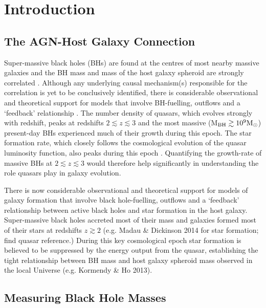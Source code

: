 \chapter{Introduction}\label{ch:introduction}

\section{The AGN-Host Galaxy Connection}

Super-massive black holes (BHs) are found at the centres of most nearby massive galaxies and the BH mass and mass of the host galaxy spheroid are strongly correlated \citep{ferrarese00,gebhardt00,kormendy13}. 
Although any underlying causal mechanism(s) responsible for the correlation is yet to be conclusively identified, there is considerable observational and theoretical support for models that involve BH-fuelling, outflows and a `feedback' relationship \citep[e.g.][]{king15}.  
The number density of quasars, which evolves strongly with redshift, peaks at redshifts $2 \lesssim z \lesssim 3$ \citep[e.g.][]{brandt05,richards06b} and the most massive (M$_{\rm BH} \gtrsim 10^9{{{\rm M_\odot}}}$) present-day BHs experienced much of their growth during this epoch.  
The star formation rate, which closely follows the cosmological evolution of the quasar luminosity function, also peaks during this epoch \citep[e.g.][]{boyle98}. 
Quantifying the growth-rate of massive BHs at $2 \lesssim z \lesssim 3$ would therefore help significantly in understanding the role quasars play in galaxy evolution.

There is now considerable observational and theoretical support for models of galaxy formation that involve black hole-fuelling, outflows and a ‘feedback’ relationship between active black holes and star formation in the host galaxy. 
Super-massive black holes accreted most of their mass and galaxies formed most of their stars at redshifts $z\gtrsim2$ (e.g. Madau \& Dickinson 2014 for star formation; find quasar reference.)
During this key cosmological epoch star formation is believed to be suppressed by the energy output from the quasar, establishing the tight relationship between BH mass and host galaxy spheroid mass observed in the local Universe (e.g. Kormendy \& Ho 2013). 

\section{Measuring Black Hole Masses}

